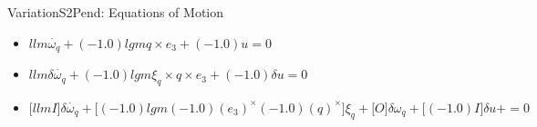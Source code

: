VariationS2Pend: Equations of Motion
\begin{itemize}
\item $l l m \dot{\omega_{q}}+(-1.0) l g m q\times e_3+(-1.0) u=0$
\item $l l m \delta \dot{\omega_{q}}+(-1.0) l g m \xi_{q}\times q\times e_3+(-1.0) \delta u=0$
\item $\Big[l l m I\Big]\delta \dot{\omega_{q}}+\Big[(-1.0) l g m (-1.0) {(e_3)}^\times (-1.0) {(q)}^\times\Big]\xi_{q}+\Big[O\Big]\delta \omega_{q}+\Big[(-1.0) I\Big]\delta u+=0$
\end{itemize}